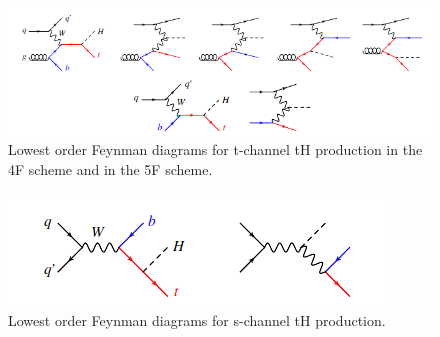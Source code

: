 \documentclass[final,3p]{CSP}
\begin{document}
\begin{figure}
  \centering
   \includegraphics[width=\columnwidth]{./th2.png}
  \caption{Lowest order Feynman diagrams for t-channel tH production in the 4F scheme and in the 5F scheme.}
   \label{figure 19}
\end{figure}

\begin{figure}
  \centering
   \includegraphics[width=\columnwidth]{./th3.png}
  \caption{Lowest order Feynman diagrams for s-channel tH production.}
   \label{figure 20}
\end{figure}
\end{document}
